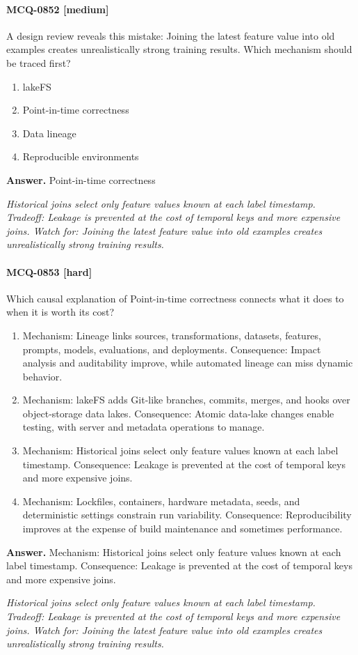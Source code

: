 \paragraph{MCQ-0852 [medium]} A design review reveals this mistake: Joining the latest feature value into old examples creates unrealistically strong training results. Which mechanism should be traced first?
\begin{enumerate}[label=\Alph*.]
\item lakeFS
\item Point-in-time correctness
\item Data lineage
\item Reproducible environments
\end{enumerate}
\noindent\textbf{Answer.} Point-in-time correctness
\par\textit{Historical joins select only feature values known at each label timestamp. Tradeoff: Leakage is prevented at the cost of temporal keys and more expensive joins. Watch for: Joining the latest feature value into old examples creates unrealistically strong training results.}
\paragraph{MCQ-0853 [hard]} Which causal explanation of Point-in-time correctness connects what it does to when it is worth its cost?
\begin{enumerate}[label=\Alph*.]
\item Mechanism: Lineage links sources, transformations, datasets, features, prompts, models, evaluations, and deployments. Consequence: Impact analysis and auditability improve, while automated lineage can miss dynamic behavior.
\item Mechanism: lakeFS adds Git-like branches, commits, merges, and hooks over object-storage data lakes. Consequence: Atomic data-lake changes enable testing, with server and metadata operations to manage.
\item Mechanism: Historical joins select only feature values known at each label timestamp. Consequence: Leakage is prevented at the cost of temporal keys and more expensive joins.
\item Mechanism: Lockfiles, containers, hardware metadata, seeds, and deterministic settings constrain run variability. Consequence: Reproducibility improves at the expense of build maintenance and sometimes performance.
\end{enumerate}
\noindent\textbf{Answer.} Mechanism: Historical joins select only feature values known at each label timestamp. Consequence: Leakage is prevented at the cost of temporal keys and more expensive joins.
\par\textit{Historical joins select only feature values known at each label timestamp. Tradeoff: Leakage is prevented at the cost of temporal keys and more expensive joins. Watch for: Joining the latest feature value into old examples creates unrealistically strong training results.}
